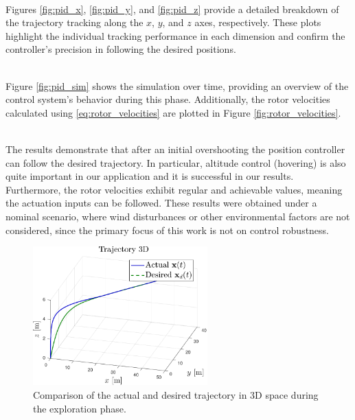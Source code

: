 \documentclass[main]{subfiles}
\begin{document}
\noindent\\
Figures \ref{fig:pid_x}, \ref{fig:pid_y}, and \ref{fig:pid_z}
provide a detailed breakdown of the trajectory tracking along 
the \(x\), \(y\), and \(z\) axes, respectively. 
These plots highlight the individual tracking performance 
in each dimension and confirm the controller's precision 
in following the desired positions.

\noindent\\
Figure \ref{fig:pid_sim} shows the simulation over time,
providing an overview of the control system's behavior 
during this phase. Additionally, the rotor velocities 
calculated using \eqref{eq:rotor_velocities} are plotted 
in Figure \ref{fig:rotor_velocities}. 

\noindent\\
The results demonstrate
that after an initial overshooting the position controller
can follow the desired trajectory.
In particular, altitude control (hovering) is also quite important in our application
and it is successful in our results.
Furthermore, the rotor velocities exhibit regular and achievable values,
meaning the actuation inputs can be followed.
These results were obtained under a nominal scenario, 
where wind disturbances or other environmental factors are not considered,
since the primary focus of this work is not on control robustness.
\begin{figure}
    \centering
    \includegraphics[width=0.6\textwidth]{images/trajectory_comparison.pdf}
    \caption[3D Trajectory Tracking]{Comparison of the actual and desired trajectory in 3D space during the exploration phase.}
    \label{fig:pd_traj_comparison}
\end{figure}
\end{document}
